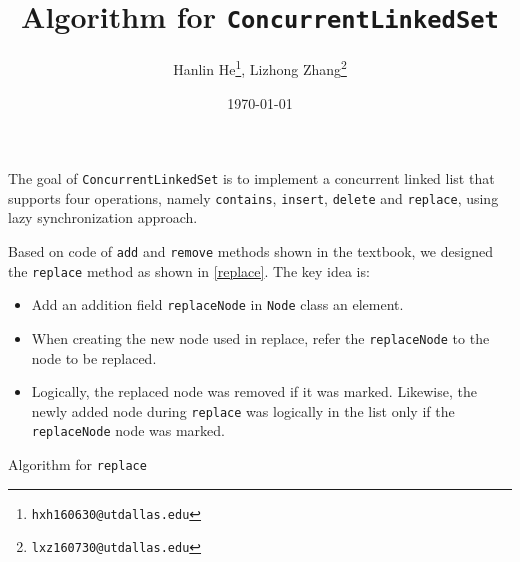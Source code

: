 \documentclass{article}
\title{Algorithm for \texttt{ConcurrentLinkedSet}}
\author{
    Hanlin He\footnote{\texttt{hxh160630@utdallas.edu}},
    Lizhong Zhang\footnote{\texttt{lxz160730@utdallas.edu}}
}
\date{\today}
\begin{document}
\maketitle

The goal of \texttt{ConcurrentLinkedSet} is to implement a concurrent linked
list that supports four operations, namely \texttt{contains}, \texttt{insert},
\texttt{delete} and \texttt{replace}, using lazy synchronization approach.

Based on code of \texttt{add} and \texttt{remove} methods shown in the
textbook, we designed the \texttt{replace} method as shown in \cref{replace}.
The key idea is:
\begin{itemize}
    \item Add an addition field \texttt{replaceNode} in \texttt{Node} class an
        element.
    \item When creating the new node used in replace, refer the
        \texttt{replaceNode} to the node to be replaced.
    \item Logically, the replaced node was removed if it was marked. Likewise,
        the newly added node during \texttt{replace} was logically in the list
        only if the \texttt{replaceNode} node was marked.
\end{itemize}

\begin{algorithm}[H]
    \caption{Algorithm for \texttt{replace}}\label{replace}
    \begin{algorithmic}
            \EndIf{}
                    \Else{}
                    \EndIf
                \Else{}
                    \Else{}
                    \EndIf{}
                \EndIf{}
            \EndWhile{}
        \EndFunction{}
    \end{algorithmic}
\end{algorithm}
\end{document}
